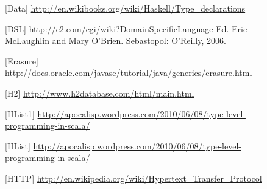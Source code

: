 \documentclass[a4]{article}
\begin{document}
\clearpage
\begin{figure}[b][Data]
\url{http://en.wikibooks.org/wiki/Haskell/Type_declarations}
\end{figure}
\begin{figure}[b][DSL]
\url{http://c2.com/cgi/wiki?DomainSpecificLanguage}
Ed.  Eric  McLaughlin  and  Mary  O'Brien. Sebastopol: O'Reilly, 2006.
\end{figure}
\begin{figure}[b][Erasure]
\url{http://docs.oracle.com/javase/tutorial/java/generics/erasure.html}
\end{figure}
\begin{figure}[b][H2]
\url{http://www.h2database.com/html/main.html}
\end{figure}
\begin{figure}[b][HList1]
\url{http://apocalisp.wordpress.com/2010/06/08/type-level-programming-in-scala/}
\end{figure}
\begin{figure}[b][HList]
\url{http://apocalisp.wordpress.com/2010/06/08/type-level-programming-in-scala/}
\end{figure}
\begin{figure}[b][HTTP]
\url{http://en.wikipedia.org/wiki/Hypertext_Transfer_Protocol}
\end{figure}
\end{document}
